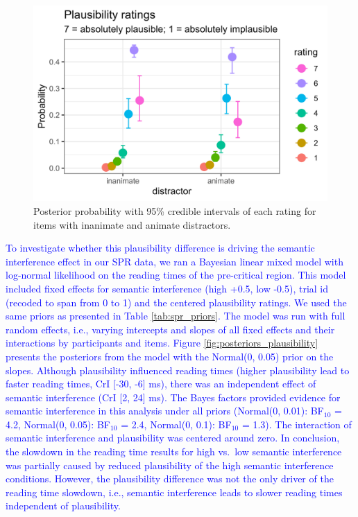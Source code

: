 \documentclass[a4paper, man, floatsintext]{apa7}
\begin{document}
{\begin{figure}[htpb]
    \centering
        \caption{Posterior probability with 95\% credible intervals of each rating for items with inanimate and animate distractors.}
    \label{fig:plausibility_anim_inanim}
    \includegraphics[width=0.8\linewidth]{images/plausibility_anim_inan.jpg}
\end{figure}

\textcolor{blue}{To investigate whether this plausibility difference is driving the semantic interference effect in our SPR data, we ran a Bayesian linear mixed model with log-normal likelihood on the reading times of the pre-critical region. This model included fixed effects for semantic interference (high +0.5, low -0.5), trial id (recoded to span from 0 to 1) and the centered plausibility ratings. We used the same priors as presented in Table \ref{tab:spr_priors}. The model was run with full random effects, i.e., varying intercepts and slopes of all fixed effects and their interactions by participants and items. Figure \ref{fig:posteriors_plausibility} presents the posteriors from the model with the Normal(0, 0.05) prior on the slopes. Although plausibility influenced reading times (higher plausibility lead to faster reading times, CrI [-30, -6] ms), there was an independent effect of semantic interference (CrI [2, 24] ms). The Bayes factors provided evidence for semantic interference in this analysis under all priors (Normal(0, 0.01): BF$_{10}$ = 4.2,
Normal(0, 0.05): BF$_{10}$ = 2.4,
Normal(0, 0.1): BF$_{10}$ = 1.3). The interaction of semantic interference and plausibility was centered around zero. In conclusion, the slowdown in the reading time results for high vs.\ low semantic interference was partially caused by reduced plausibility of the high semantic interference conditions. However, the plausibility difference was not the only driver of the reading time slowdown, i.e., semantic interference leads to slower reading times independent of plausibility.}

}
\end{document}
